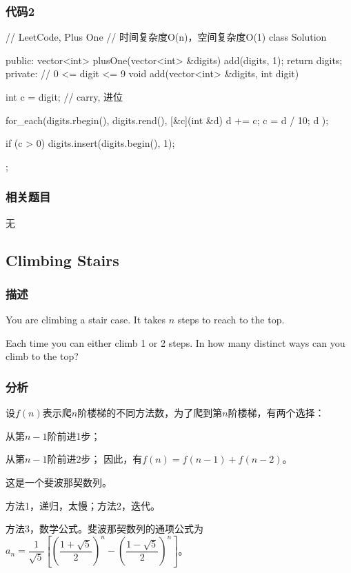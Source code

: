 \subsubsection{代码2}
\begin{Code}
// LeetCode, Plus One
// 时间复杂度O(n)，空间复杂度O(1)
class Solution {
public:
    vector<int> plusOne(vector<int> &digits) {
        add(digits, 1);
        return digits;
    }
private:
    // 0 <= digit <= 9
    void add(vector<int> &digits, int digit) {
        int c = digit;  // carry, 进位

        for_each(digits.rbegin(), digits.rend(), [&c](int &d){
            d += c;
            c = d / 10;
            d %
        });

        if (c > 0) digits.insert(digits.begin(), 1);
    }
};
\end{Code}


\subsubsection{相关题目}
\begindot
\item 无
\myenddot


\subsection{Climbing Stairs} %
\label{sec:climbing-stairs}


\subsubsection{描述}
You are climbing a stair case. It takes $n$ steps to reach to the top.

Each time you can either climb 1 or 2 steps. In how many distinct ways can you climb to the top?


\subsubsection{分析}
设$f(n)$表示爬$n$阶楼梯的不同方法数，为了爬到第$n$阶楼梯，有两个选择：
\begindot
\item 从第$n-1$阶前进1步；
\item 从第$n-1$阶前进2步；
\myenddot
因此，有$f(n)=f(n-1)+f(n-2)$。

这是一个斐波那契数列。

方法1，递归，太慢；方法2，迭代。

方法3，数学公式。斐波那契数列的通项公式为 $a_n=\dfrac{1}{\sqrt{5}}\left[\left(\dfrac{1+\sqrt{5}}{2}\right)^n-\left(\dfrac{1-\sqrt{5}}{2}\right)^n\right]$。



